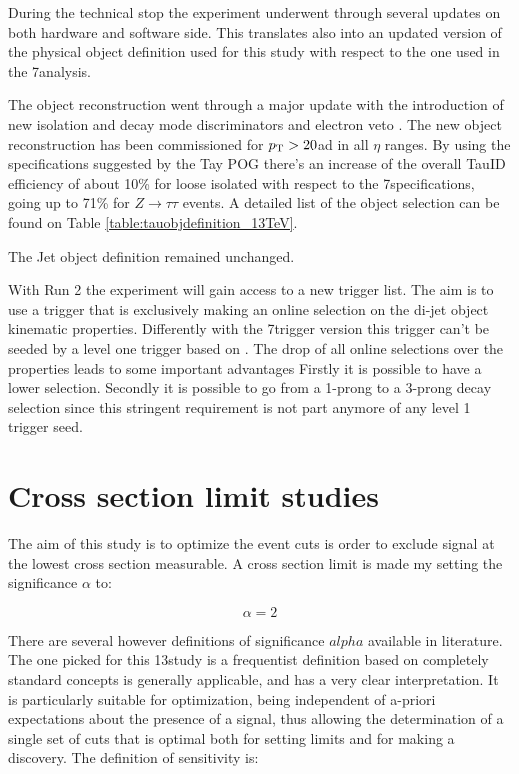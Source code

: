 During the technical stop the experiment underwent through several updates on both hardware and software side. This	translates also into an updated version of the physical object definition used for this study with respect to the one used in the 7\tev analysis.

The \hadtau object reconstruction went through a major update with the introduction of new isolation and decay mode discriminators and electron veto \cite{bib:TauID_13tev}. The new \hadtau object reconstruction has been commissioned for $p_{\text{T}} > 20$\gev ad in all $\eta$ ranges. By using the specifications suggested by the Tay POG there's an increase of the overall TauID efficiency of about 10\% for loose isolated \hadtau with respect to the 7\tev specifications, going up to 71\% for $Z \longrightarrow\tau\tau$ events\cite{bib:TauID_13tev}. A detailed list of the \hadtau object selection can be found on Table \ref{table:tauobjdefinition_13TeV}. 

The Jet object definition remained unchanged.  

With Run 2 the experiment will gain access to a new trigger list. The aim is to use a trigger that is exclusively making an online selection on the di-jet object kinematic properties. Differently with the 7\tev trigger version this trigger can't be seeded by a level one trigger based on \met. The drop of all online selections over the \hadtau properties leads to some important advantages Firstly it is possible to have a lower \hadtau \pt selection. Secondly it is possible to go from a 1-prong to a 3-prong decay selection since this stringent requirement is not part anymore of any level 1 trigger seed. 



\section{Cross section limit studies}

The aim of this study is to optimize the event cuts is order to exclude signal at the lowest cross section measurable. A cross section limit is made my setting the significance $\alpha$ to:

\begin{equation}
\alpha = 2
\label{eq::significance_xsec_limit}
\end{equation}

There are several however definitions of significance $alpha$ available in literature. The one picked for this 13\tev study is a frequentist definition based on completely standard concepts\cite{Punzi:2003bu} is generally applicable, and has a very clear interpretation. It is particularly suitable for optimization, being independent of a-priori expectations about the presence of a signal, thus allowing the determination of a single set of cuts that is optimal both for setting limits and for making a discovery. The definition of sensitivity is:

